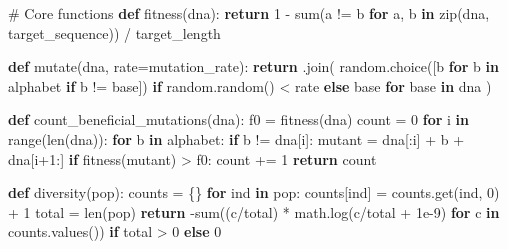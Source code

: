 \documentclass[
  letterpaper,
  DIV=11,
  numbers=noendperiod]{scrreprt}
\newenvironment{Shaded}{\begin{snugshade}}{\end{snugshade}}
\newcommand{\BuiltInTok}[1]{\textcolor[rgb]{0.00,0.23,0.31}{#1}}
\newcommand{\CommentTok}[1]{\textcolor[rgb]{0.37,0.37,0.37}{#1}}
\newcommand{\ControlFlowTok}[1]{\textcolor[rgb]{0.00,0.23,0.31}{\textbf{#1}}}
\newcommand{\DecValTok}[1]{\textcolor[rgb]{0.68,0.00,0.00}{#1}}
\newcommand{\FloatTok}[1]{\textcolor[rgb]{0.68,0.00,0.00}{#1}}
\newcommand{\KeywordTok}[1]{\textcolor[rgb]{0.00,0.23,0.31}{\textbf{#1}}}
\newcommand{\NormalTok}[1]{\textcolor[rgb]{0.00,0.23,0.31}{#1}}
\newcommand{\OperatorTok}[1]{\textcolor[rgb]{0.37,0.37,0.37}{#1}}
\newcommand{\StringTok}[1]{\textcolor[rgb]{0.13,0.47,0.30}{#1}}
\theoremstyle{definition}
\theoremstyle{remark}
\begin{document}
\begin{tcolorbox}
\begin{Shaded}
\begin{Highlighting}[]
\CommentTok{\# Core functions}
\KeywordTok{def}\NormalTok{ fitness(dna):}
    \ControlFlowTok{return} \DecValTok{1} \OperatorTok{{-}} \BuiltInTok{sum}\NormalTok{(a }\OperatorTok{!=}\NormalTok{ b }\ControlFlowTok{for}\NormalTok{ a, b }\KeywordTok{in} \BuiltInTok{zip}\NormalTok{(dna, target\_sequence)) }\OperatorTok{/}\NormalTok{ target\_length}

\KeywordTok{def}\NormalTok{ mutate(dna, rate}\OperatorTok{=}\NormalTok{mutation\_rate):}
    \ControlFlowTok{return} \StringTok{\textquotesingle{}\textquotesingle{}}\NormalTok{.join(}
\NormalTok{        random.choice([b }\ControlFlowTok{for}\NormalTok{ b }\KeywordTok{in}\NormalTok{ alphabet }\ControlFlowTok{if}\NormalTok{ b }\OperatorTok{!=}\NormalTok{ base]) }\ControlFlowTok{if}\NormalTok{ random.random() }\OperatorTok{\textless{}}\NormalTok{ rate }\ControlFlowTok{else}\NormalTok{ base}
        \ControlFlowTok{for}\NormalTok{ base }\KeywordTok{in}\NormalTok{ dna}
\NormalTok{    )}

\KeywordTok{def}\NormalTok{ count\_beneficial\_mutations(dna):}
\NormalTok{    f0 }\OperatorTok{=}\NormalTok{ fitness(dna)}
\NormalTok{    count }\OperatorTok{=} \DecValTok{0}
    \ControlFlowTok{for}\NormalTok{ i }\KeywordTok{in} \BuiltInTok{range}\NormalTok{(}\BuiltInTok{len}\NormalTok{(dna)):}
        \ControlFlowTok{for}\NormalTok{ b }\KeywordTok{in}\NormalTok{ alphabet:}
            \ControlFlowTok{if}\NormalTok{ b }\OperatorTok{!=}\NormalTok{ dna[i]:}
\NormalTok{                mutant }\OperatorTok{=}\NormalTok{ dna[:i] }\OperatorTok{+}\NormalTok{ b }\OperatorTok{+}\NormalTok{ dna[i}\OperatorTok{+}\DecValTok{1}\NormalTok{:]}
                \ControlFlowTok{if}\NormalTok{ fitness(mutant) }\OperatorTok{\textgreater{}}\NormalTok{ f0:}
\NormalTok{                    count }\OperatorTok{+=} \DecValTok{1}
    \ControlFlowTok{return}\NormalTok{ count}

\KeywordTok{def}\NormalTok{ diversity(pop):}
\NormalTok{    counts }\OperatorTok{=}\NormalTok{ \{\}}
    \ControlFlowTok{for}\NormalTok{ ind }\KeywordTok{in}\NormalTok{ pop:}
\NormalTok{        counts[ind] }\OperatorTok{=}\NormalTok{ counts.get(ind, }\DecValTok{0}\NormalTok{) }\OperatorTok{+} \DecValTok{1}
\NormalTok{    total }\OperatorTok{=} \BuiltInTok{len}\NormalTok{(pop)}
    \ControlFlowTok{return} \OperatorTok{{-}}\BuiltInTok{sum}\NormalTok{((c}\OperatorTok{/}\NormalTok{total) }\OperatorTok{*}\NormalTok{ math.log(c}\OperatorTok{/}\NormalTok{total }\OperatorTok{+} \FloatTok{1e{-}9}\NormalTok{) }\ControlFlowTok{for}\NormalTok{ c }\KeywordTok{in}\NormalTok{ counts.values()) }\ControlFlowTok{if}\NormalTok{ total }\OperatorTok{\textgreater{}} \DecValTok{0} \ControlFlowTok{else} \DecValTok{0}


\end{Highlighting}
\end{Shaded}
\end{tcolorbox}
\end{document}

